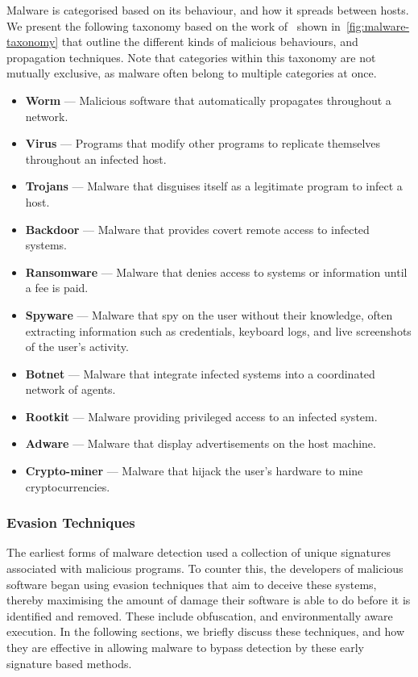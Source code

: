 \documentclass[conference,compsoc]{IEEEtran}
\begin{document}
Malware is categorised based on its behaviour, and how it spreads between hosts. We present the following taxonomy based on the work of~\cite{manirihoSystematicLiteratureReview2024} shown in~\ref{fig:malware-taxonomy} that outline the different kinds of malicious behaviours, and propagation techniques. Note that categories within this taxonomy are not mutually exclusive, as malware often belong to multiple categories at once. 

\begin{itemize}
    \item \textbf{Worm} --- Malicious software that automatically propagates throughout a network. 
    \item \textbf{Virus} --- Programs that modify other programs to replicate themselves throughout an infected host. 
    \item \textbf{Trojans} --- Malware that disguises itself as a legitimate program to infect a host.
    \item \textbf{Backdoor} --- Malware that provides covert remote access to infected systems. 
    \item \textbf{Ransomware} --- Malware that denies access to systems or information until a fee is paid.
    \item \textbf{Spyware} --- Malware that spy on the user without their knowledge, often extracting information such as credentials, keyboard logs, and live screenshots of the user's activity. 
    \item \textbf{Botnet} --- Malware that integrate infected systems into a coordinated network of agents. 
    \item \textbf{Rootkit} --- Malware providing privileged access to an infected system.
    \item \textbf{Adware} --- Malware that display advertisements on the host machine.
    \item \textbf{Crypto-miner} --- Malware that hijack the user's hardware to mine cryptocurrencies.
\end{itemize}

\subsubsection{Evasion Techniques}

The earliest forms of malware detection used a collection of unique signatures associated with malicious programs\cite{a.saeedSurveyMalwareMalware2013}. To counter this, the developers of malicious software began using evasion techniques that aim to deceive these systems, thereby maximising the amount of damage their software is able to do before it is identified and removed. These include obfuscation, and environmentally aware execution. In the following sections, we briefly discuss these techniques, and how they are effective in allowing malware to bypass detection by these early signature based methods.
\end{document}
